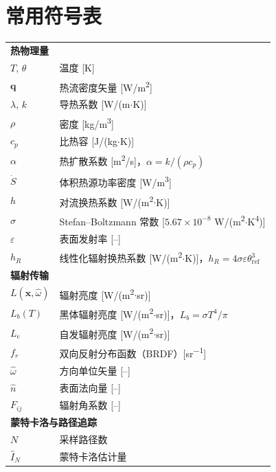 \chapter{常用符号表}
\begin{appendix*}
	\begin{tabular}{p{7em}p{25em}}
		\multicolumn{2}{l}{\textbf{热物理量}} \\[3pt]
		$T$, $\theta$   & 温度 [K] \\
		$\mathbf{q}$     & 热流密度矢量 [W/m\textsuperscript{2}] \\
		$\lambda$, $k$   & 导热系数 [W/(m$\cdot$K)] \\
		$\rho$           & 密度 [kg/m\textsuperscript{3}] \\
		$c_p$            & 比热容 [J/(kg$\cdot$K)] \\
		$\alpha$         & 热扩散系数 [m\textsuperscript{2}/s]，$\alpha = k/(\rho c_p)$ \\
		$\dot{S}$        & 体积热源功率密度 [W/m\textsuperscript{3}] \\
		$h$              & 对流换热系数 [W/(m\textsuperscript{2}$\cdot$K)] \\
		$\sigma$         & Stefan--Boltzmann 常数 [$5.67 \times 10^{-8}$ W/(m\textsuperscript{2}$\cdot$K\textsuperscript{4})] \\
		$\varepsilon$    & 表面发射率 [--] \\
		$h_R$            & 线性化辐射换热系数 [W/(m\textsuperscript{2}$\cdot$K)]，$h_R = 4\sigma\varepsilon\theta_{\mathrm{ref}}^3$ \\[6pt]
		\multicolumn{2}{l}{\textbf{辐射传输}} \\[3pt]
		$L(\mathbf{x},\hat{\omega})$ & 辐射亮度 [W/(m\textsuperscript{2}$\cdot$sr)] \\
		$L_b(T)$         & 黑体辐射亮度 [W/(m\textsuperscript{2}$\cdot$sr)]，$L_b = \sigma T^4/\pi$ \\
		$L_e$            & 自发辐射亮度 [W/(m\textsuperscript{2}$\cdot$sr)] \\
		$f_r$            & 双向反射分布函数（BRDF）[sr\textsuperscript{$-1$}] \\
		$\hat{\omega}$   & 方向单位矢量 [--] \\
		$\hat{n}$        & 表面法向量 [--] \\
		$F_{ij}$         & 辐射角系数 [--] \\[6pt]
		\multicolumn{2}{l}{\textbf{蒙特卡洛与路径追踪}} \\[3pt]
		$N$              & 采样路径数 \\
		$\hat{I}_N$      & 蒙特卡洛估计量 \\

\end{tabular}
\end{appendix*}
